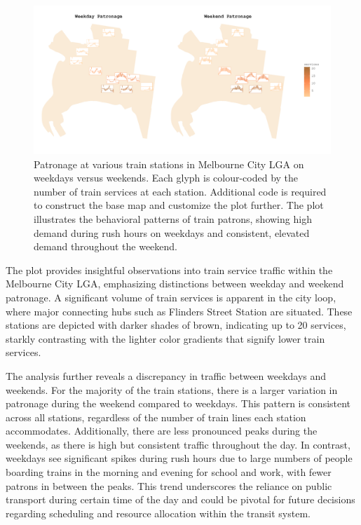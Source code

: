 \begin{figure}

{\centering \includegraphics[width=1\linewidth]{figures/weekend_weekday} 

}

\caption{Patronage at various train stations in Melbourne City LGA on weekdays versus weekends. Each glyph is colour-coded by the number of train services at each station. Additional code is required to construct the base map and customize the plot further. The plot illustrates the behavioral patterns of train patrons, showing high demand during rush hours on weekdays and consistent, elevated demand throughout the weekend.}\label{fig:unnamed-chunk-22}
\end{figure}

The plot provides insightful observations into train service traffic within the Melbourne City LGA, emphasizing distinctions between weekday and weekend patronage. A significant volume of train services is apparent in the city loop, where major connecting hubs such as Flinders Street Station are situated. These stations are depicted with darker shades of brown, indicating up to 20 services, starkly contrasting with the lighter color gradients that signify lower train services.

The analysis further reveals a discrepancy in traffic between weekdays and weekends. For the majority of the train stations, there is a larger variation in patronage during the weekend compared to weekdays. This pattern is consistent across all stations, regardless of the number of train lines each station accommodates. Additionally, there are less pronounced peaks during the weekends, as there is high but consistent traffic throughout the day. In contrast, weekdays see significant spikes during rush hours due to large numbers of people boarding trains in the morning and evening for school and work, with fewer patrons in between the peaks. This trend underscores the reliance on public transport during certain time of the day and could be pivotal for future decisions regarding scheduling and resource allocation within the transit system.

